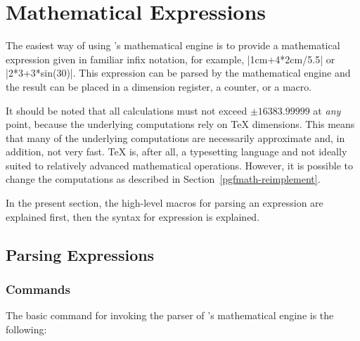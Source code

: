 %
%
%


\section{Mathematical Expressions}
\label{pgfmath-syntax}

The easiest way of using \pgfname's mathematical engine is to provide a
mathematical expression given in familiar infix notation, for example,
|1cm+4*2cm/5.5| or |2*3+3*sin(30)|. This expression can be parsed by the
mathematical engine and the result can be placed in a dimension register, a
counter, or a macro.

It should be noted that all calculations must not exceed $\pm16383.99999$ at
\emph{any} point, because the underlying computations rely on \TeX{}
dimensions. This means that many of the underlying computations are necessarily
approximate and, in addition, not very fast. \TeX{} is, after all, a
typesetting language and not ideally suited to relatively advanced mathematical
operations. However, it is possible to change the computations as described in
Section~\ref{pgfmath-reimplement}.

In the present section, the high-level macros for parsing an expression are
explained first, then the syntax for expression is explained.


\subsection{Parsing Expressions}
\label{pgfmath-registers}
\label{pgfmath-parsing}

\subsubsection{Commands}

The basic command for invoking the parser of \pgfname's
mathematical engine is the following:

